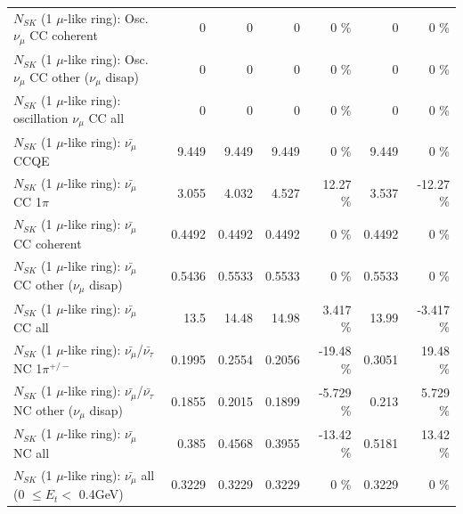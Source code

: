 \begin{table}
\begin{tabular}{| l | r | r | r  r | r  r |}
                        $N_{SK}$ (1 $\mu$-like ring): Osc. $\nu_\mu$ CC coherent &               0 &               0 &               0 &        0 \%  &               0 &        0 \%  \\ 
         $N_{SK}$ (1 $\mu$-like ring): Osc. $\nu_\mu$ CC other ($\nu_\mu$ disap) &               0 &               0 &               0 &        0 \%  &               0 &        0 \%  \\ 
                      $N_{SK}$ (1 $\mu$-like ring): oscillation $\nu_\mu$ CC all &               0 &               0 &               0 &        0 \%  &               0 &        0 \%  \\ 
\hline
\hline
                              $N_{SK}$ (1 $\mu$-like ring): $\bar{\nu_\mu}$ CCQE &           9.449 &           9.449 &           9.449 &        0 \%  &           9.449 &        0 \%  \\ 
                         $N_{SK}$ (1 $\mu$-like ring): $\bar{\nu_\mu}$ CC 1$\pi$ &           3.055 &           4.032 &           4.527 &    12.27 \%  &           3.537 &   -12.27 \%  \\ 
                       $N_{SK}$ (1 $\mu$-like ring): $\bar{\nu_\mu}$ CC coherent &          0.4492 &          0.4492 &          0.4492 &        0 \%  &          0.4492 &        0 \%  \\ 
        $N_{SK}$ (1 $\mu$-like ring): $\bar{\nu_\mu}$ CC other ($\nu_\mu$ disap) &          0.5436 &          0.5533 &          0.5533 &        0 \%  &          0.5533 &        0 \%  \\ 
                          $N_{SK}$ (1 $\mu$-like ring): $\bar{\nu_{\mu}}$ CC all &            13.5 &           14.48 &           14.98 &    3.417 \%  &           13.99 &   -3.417 \%  \\ 
\hline
  $N_{SK}$ (1 $\mu$-like ring): $\bar{\nu_\mu}$/$\bar{\nu_\tau}$ NC 1$\pi^{+/-}$ &          0.1995 &          0.2554 &          0.2056 &   -19.48 \%  &          0.3051 &    19.48 \%  \\ 
$N_{SK}$ (1 $\mu$-like ring): $\bar{\nu_\mu}$/$\bar{\nu_\tau}$ NC other ($\nu_\mu$ disap) &          0.1855 &          0.2015 &          0.1899 &   -5.729 \%  &           0.213 &    5.729 \%  \\ 
                          $N_{SK}$ (1 $\mu$-like ring): $\bar{\nu_{\mu}}$ NC all &           0.385 &          0.4568 &          0.3955 &   -13.42 \%  &          0.5181 &    13.42 \%  \\ 
\hline
   $N_{SK}$ (1 $\mu$-like ring): $\bar{\nu_{\mu}}$ all (0 $\leq E_{t} <$ 0.4GeV) &          0.3229 &          0.3229 &          0.3229 &        0 \%  &          0.3229 &        0 \%  \\ 

\end{tabular}
\end{table}
